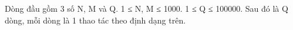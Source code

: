 Dòng đầu gồm 3 số N, M và Q. 1 ≤ N, M ≤ 1000. 1 ≤ Q ≤ 100000. Sau đó là Q dòng, mỗi dòng là 1 thao tác theo định dạng trên.  

\